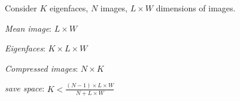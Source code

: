 \begin{definition}
  Consider \(K\) eigenfaces, \(N\) images, \(L \times W\) dimensions of images.
  \begin{itemize*}
    \item \textit{Mean image}: \(L \times W\)
    \item \textit{Eigenfaces}: \(K \times L \times W\)
    \item \textit{Compressed images}: \(N \times K\)
    \item \textit{save space}: \(K < \frac{(N - 1) \times L \times W}{N + L \times W}\)
  \end{itemize*}
\end{definition}

